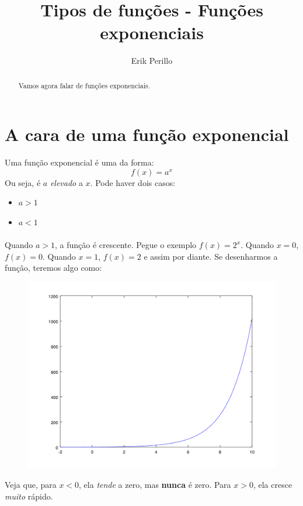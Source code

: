 \documentclass[11pt]{article}
\begin{document}
\title{Tipos de funções - Funções exponenciais}
\author{Erik Perillo}
\date{}
\maketitle
\begin{abstract}
Vamos agora falar de funções exponenciais.
\end{abstract}

\newpage

\tableofcontents

\newpage

\section{A cara de uma função exponencial}
\par
Uma função exponencial é uma da forma:
$$f(x) = a^x$$
Ou seja, é $a$ \emph{elevado} a $x$. Pode haver dois casos:
\begin{itemize}
	\item $a > 1$
	\item $a < 1$
\end{itemize}

\paragraph{}
Quando $a > 1$, a função é crescente. Pegue o exemplo $f(x) = 2^x$. Quando 
$x = 0$, $f(x) = 0$. Quando $x = 1$, $f(x) = 2$ e assim por diante. 
Se desenharmos a função, teremos algo como:
\begin{figure}[H]
	\centering
	\includegraphics[width=0.7\linewidth]{imgs/exp.png}
\end{figure}
Veja que, para $x < 0$, ela \emph{tende} a zero, mas \textbf{nunca} é zero.
Para $x > 0$, ela cresce \emph{muito} rápido.
\end{document}
